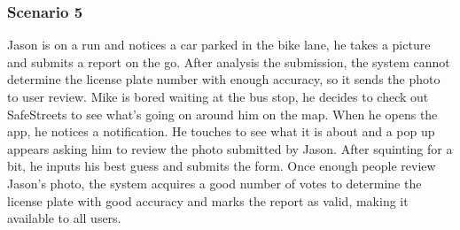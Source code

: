 \subsubsection{Scenario 5}
Jason is on a run and notices a car parked in the bike lane, he takes a picture and submits a report on the go. After analysis the submission, the system cannot determine the license plate number with enough accuracy, so it sends the photo to user review.
Mike is bored waiting at the bus stop, he decides to check out SafeStreets to see what’s going on around him on the map. When he opens the app, he notices a notification. He touches to see what it is about and a pop up appears asking him to review the photo submitted by Jason. After squinting for a bit, he inputs his best guess and submits the form.
Once enough people review Jason’s photo, the system acquires a good number of votes to determine the license plate with good accuracy and marks the report as valid, making it available to all users.

